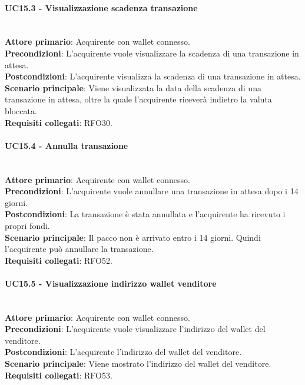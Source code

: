 \documentclass[a4paper, 12pt]{article}
\begin{document}
\paragraph{UC15.3 - Visualizzazione scadenza transazione}\\
\textbf{Attore primario}: Acquirente  con wallet connesso.\\
\textbf{Precondizioni}: L'acquirente vuole visualizzare la scadenza di una transazione in attesa.\\
\textbf{Postcondizioni}: L'acquirente visualizza la scadenza di una transazione in attesa.\\
\textbf{Scenario principale}: Viene visualizzata la data della scadenza di una transazione in attesa, oltre la quale l'acquirente riceverà indietro la valuta bloccata.\\
\textbf{Requisiti collegati}: RFO30.

\paragraph{UC15.4 - Annulla transazione}\\
\textbf{Attore primario}: Acquirente  con wallet connesso.\\
\textbf{Precondizioni}: L'acquirente vuole annullare una transazione in attesa dopo i 14 giorni.\\
\textbf{Postcondizioni}: La transazione è stata annullata e l'acquirente ha ricevuto i propri fondi.\\
\textbf{Scenario principale}: Il pacco non è arrivato entro i 14 giorni. Quindi l'acquirente può annullare la transazione.\\
\textbf{Requisiti collegati}: RFO52.

\paragraph{UC15.5 - Visualizzazione indirizzo wallet venditore}\\
\textbf{Attore primario}: Acquirente  con wallet connesso.\\
\textbf{Precondizioni}: L'acquirente vuole visualizzare l'indirizzo del wallet del venditore.\\
\textbf{Postcondizioni}: L'acquirente l'indirizzo del wallet del venditore.\\
\textbf{Scenario principale}: Viene mostrato l'indirizzo del wallet del venditore.\\
\textbf{Requisiti collegati}: RFO53.
\end{document}
